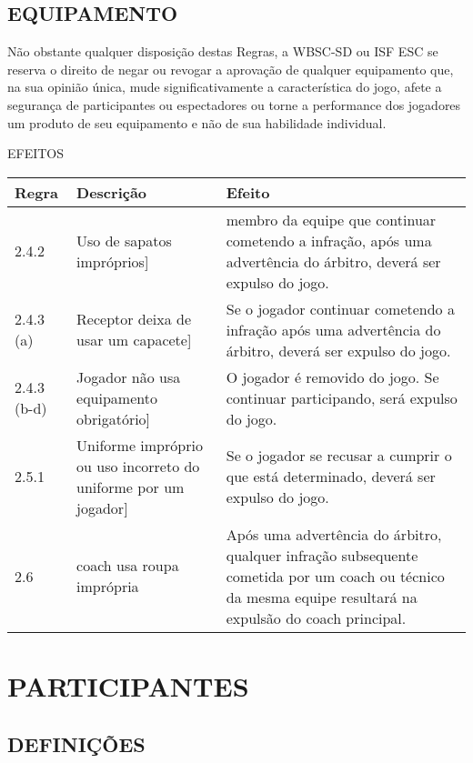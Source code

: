 \section{EQUIPAMENTO}

Não obstante qualquer disposição destas Regras, a WBSC-SD ou ISF \gls{ESC} se reserva o direito de negar ou revogar a  aprovação de qualquer equipamento que, na sua opinião única, mude significativamente a característica do jogo, afete a segurança de participantes ou espectadores ou torne a performance dos jogadores um produto de seu equipamento e não de sua habilidade individual.

EFEITOS

{\footnotesize\begin{tabular}{lp{50mm}p{80mm}}
		Regra& Descrição & Efeito\\\hline
		2.4.2 & Uso de sapatos impróprios]  &membro da equipe que continuar cometendo a infração, após uma advertência do árbitro, deverá ser expulso do jogo.\\[2mm]

		2.4.3 (a) & Receptor deixa de usar um capacete] & Se o jogador continuar cometendo a infração após uma advertência do árbitro, deverá ser expulso do jogo.\\[2mm]

		2.4.3 (b-d) & Jogador não usa equipamento obrigatório] & O jogador é removido do jogo. Se continuar participando, será expulso do jogo.\\[2mm]

		2.5.1 & Uniforme impróprio ou uso incorreto do uniforme por um jogador]& Se o jogador se recusar a cumprir o que está determinado, deverá ser expulso do jogo.\\[2mm]

		2.6 & \gls{coach} usa roupa imprópria& Após uma advertência do árbitro, qualquer infração subsequente cometida por um \gls{coach} ou técnico da mesma equipe resultará na expulsão do \gls{coach} principal.\\\hline
\end{tabular}}

\chapter{PARTICIPANTES}
\minitoc%

\section{DEFINIÇÕES}
